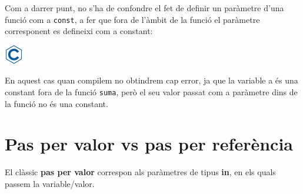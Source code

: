 \documentclass[]{book}
\newenvironment{Shaded}{\begin{snugshade}}{\end{snugshade}}
\newcommand{\DataTypeTok}[1]{\textcolor[rgb]{0.13,0.29,0.53}{#1}}
\newcommand{\DecValTok}[1]{\textcolor[rgb]{0.00,0.00,0.81}{#1}}
\newcommand{\SpecialCharTok}[1]{\textcolor[rgb]{0.00,0.00,0.00}{#1}}
\newcommand{\StringTok}[1]{\textcolor[rgb]{0.31,0.60,0.02}{#1}}
\newcommand{\ImportTok}[1]{#1}
\newcommand{\CommentTok}[1]{\textcolor[rgb]{0.56,0.35,0.01}{\textit{#1}}}
\newcommand{\ControlFlowTok}[1]{\textcolor[rgb]{0.13,0.29,0.53}{\textbf{#1}}}
\newcommand{\PreprocessorTok}[1]{\textcolor[rgb]{0.56,0.35,0.01}{\textit{#1}}}
\newcommand{\NormalTok}[1]{#1}
\begin{document}
Com a darrer punt, no s'ha de confondre el fet de definir un paràmetre
d'una funció com a \texttt{const}, a fer que fora de l'àmbit de la
funció el paràmetre corresponent es defineixi com a constant:

\includegraphics{./img/c.png}

\begin{Shaded}
\end{Shaded}

En aquest cas quan compilem no obtindrem cap error, ja que la variable a
és una constant fora de la funció \texttt{suma}, però el seu valor
passat com a paràmetre dins de la funció no és una constant.

\section{Pas per valor vs pas per
referència}\label{pas-per-valor-vs-pas-per-referencia}

El clàssic \textbf{pas per valor} correspon als paràmetres de tipus
\textbf{in}, en els quals passem la variable/valor.
\end{document}
